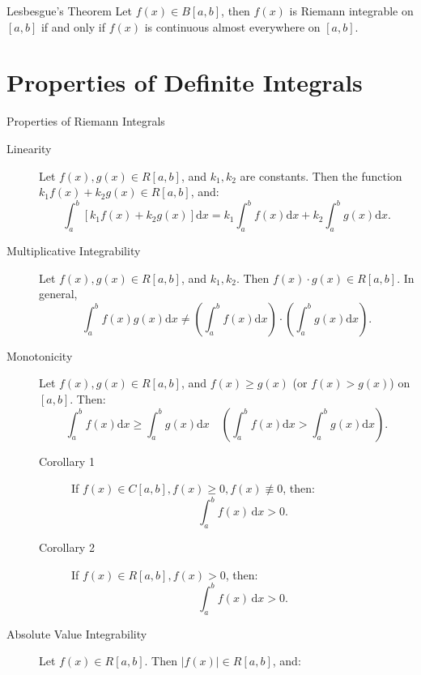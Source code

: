 \documentclass[11pt]{../../TexTemplate/elegantbook}
\begin{document}
\begin{theorem}{Lesbesgue's Theorem}
    Let \(f(x)\in B[a,b]\), then \(f(x)\) is Riemann integrable on \([a,b]\) if and only if 
    \(f(x)\) is continuous almost everywhere on \([a,b]\).
\end{theorem}


\section{Properties of Definite Integrals}
\begin{leftbarTitle}{Properties of Riemann Integrals}\end{leftbarTitle}
\begin{property}
    \begin{description}
        \item [Linearity] Let \( f(x), g(x) \in R[a, b] \), and \( k_1, k_2 \) are constants. 
            Then the function \( k_1 f(x) + k_2 g(x) \in R[a, b] \), and:
            \[
            \int_{a}^b [k_1 f(x) + k_2 g(x)] \mathrm{d}x = k_1 \int_{a}^b f(x) \mathrm{d}x + k_2 \int_{a}^b g(x) \mathrm{d}x.
            \]
        \item[Multiplicative Integrability] Let \( f(x), g(x) \in R[a, b] \), and \( k_1, k_2 \). 
            Then \( f(x) \cdot g(x) \in R[a, b] \). In general, 
            \[
            \int_{a}^b f(x) g(x) \mathrm{d}x \neq \left( \int_{a}^b f(x) \mathrm{d}x \right) \cdot \left( \int_{a}^b g(x) \mathrm{d}x \right).
            \]
        \item[Monotonicity] Let \( f(x), g(x) \in R[a, b] \), 
            and \( f(x) \geqslant g(x) \) (or \( f(x) > g(x) \)) on \( [a, b] \). Then:
            \[
            \int_{a}^b f(x) \mathrm{d}x \geqslant \int_{a}^b g(x) \mathrm{d}x \quad \left( \int_{a}^b f(x) \mathrm{d}x > \int_{a}^b g(x) \mathrm{d}x \right).
            \]
            \begin{description}
                \item[Corollary 1] If \( f(x) \in C[a, b], f(x) \geqslant 0, f(x) \not\equiv 0 \), then:
                    \[
                    \int_{a}^{b} f(x) \, \mathrm{d}x > 0.
                    \]
                \item[Corollary 2] If \( f(x) \in R[a, b], f(x) > 0 \), then:
                    \[
                    \int_{a}^{b} f(x) \, \mathrm{d}x > 0.
                    \]
            \end{description}
        \item[Absolute Value Integrability] Let \( f(x) \in R[a, b] \). Then \( |f(x)| \in R[a, b] \), and:

\end{description}
\end{property}
\end{document}
